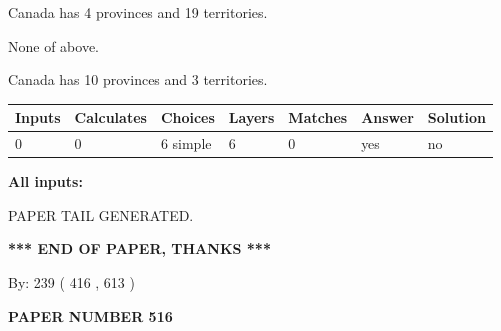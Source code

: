 \documentclass[12pt]{article}
\begin{document}
 
Canada has   4 provinces and  19 territories.
 
 
 None of above.
 
 
\noindent{}
 
 
Canada has 10  provinces and 3 territories.
 
 
\noindent{}
 
 
   
   
   
   
\noindent\begin{tabular}{|l|l|l|l|l|l|l|}
 \hline
Inputs & Calculates & Choices & Layers & Matches & Answer & Solution \\ \hline
 0  & 
 0  & 
 6
  simple  
  & 
 6  & 
 0  & 
  yes & 
  no 
  \\ \hline
 \end{tabular}
   
   
   
   
\noindent{}
   
   
   
   
\noindent\vspace{0.1in}\hspace{-0.08in} {\textbf{\Large{All inputs: }}}
   
   
   
   
   
   
 \vspace{0.2in}
 
   
   
\vspace{2.0in} PAPER TAIL GENERATED.
   
   
   
   
\vspace{1.0in} 
{\textbf{\large{ *** END OF PAPER, THANKS *** }}} 
   
   
\hspace{1.0in} By: 
 239 ( 416 ,  613 )
   
   
   
   
\newpage 
\setcounter{page}{ 
   516001 } 
   
   
   
   
 {\textbf{ \Large{ PAPER NUMBER  516  }}}
   
\end{document}
